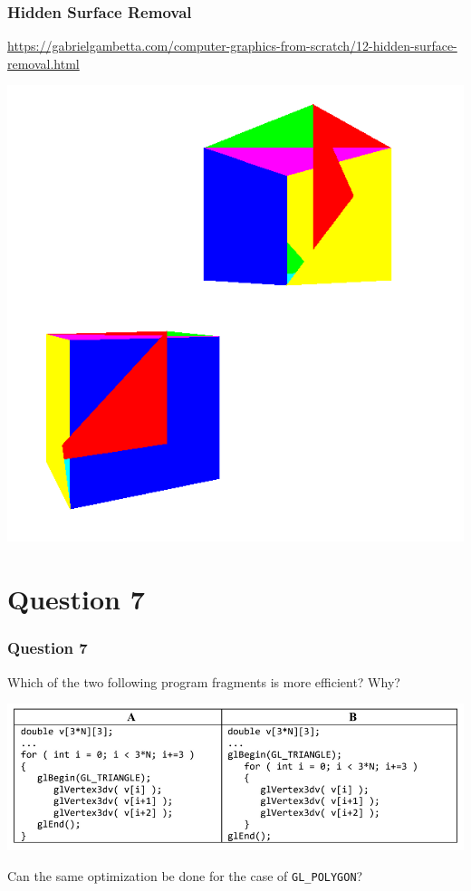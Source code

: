 \documentclass{beamer}
\begin{document}
\begin{frame}
    \frametitle{Hidden Surface Removal}

    \url{https://gabrielgambetta.com/computer-graphics-from-scratch/12-hidden-surface-removal.html}

    \begin{center}
        \includegraphics[scale=0.3]{hsr.png}
    \end{center}

\end{frame}

\section{Question 7}

\begin{frame}
    \frametitle{Question 7}
    Which of the two following program fragments is more efficient? Why?

    \begin{center}
        \includegraphics[scale=0.6]{q7.png}
    \end{center}

    Can the same optimization be done for the case of \texttt{GL\_POLYGON}?
\end{frame}
\end{document}
